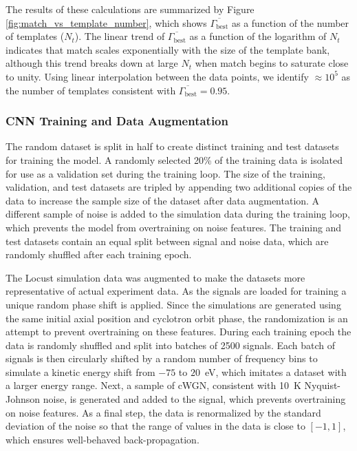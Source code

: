 The results of these calculations are summarized by Figure \ref{fig:match_vs_template_number}, which shows $\overline{\Gamma_\mathrm{best}}$ as a function of the number of templates ($N_t$). The linear trend of $\overline{\Gamma_\mathrm{best}}$ as a function of the logarithm of $N_t$ indicates that match scales exponentially with the size of the template bank, although this trend breaks down at large $N_t$ when match begins to saturate close to unity. Using linear interpolation between the data points, we identify $\approx10^5$ as the number of templates consistent with $\overline{\Gamma_\mathrm{best}}=0.95$.

\subsubsection{CNN Training and Data Augmentation}
The random dataset is split in half to create distinct training and test datasets for training the model. A randomly selected 20\% of the training data is isolated for use as a validation set during the training loop. The size of the training, validation, and test datasets are tripled by appending two additional copies of the data to increase the sample size of the dataset after data augmentation. A different sample of noise is added to the simulation data during the training loop, which prevents the model from overtraining on noise features. The training and test datasets contain an equal split between signal and noise data, which are randomly shuffled after each training epoch.

The Locust simulation data was augmented to make the datasets more representative of actual experiment data. As the signals are loaded for training a unique random phase shift is applied. Since the simulations are generated using the same initial axial position and cyclotron orbit phase, the randomization is an attempt to prevent overtraining on these features. During each training epoch the data is randomly shuffled and split into batches of 2500 signals. Each batch of signals is then circularly shifted by a random number of frequency bins to simulate a kinetic energy shift from $-75$ to $20$~eV, which imitates a dataset with a larger energy range. Next, a sample of cWGN, consistent with 10~K Nyquist-Johnson noise, is generated and added to the signal, which prevents overtraining on noise features. As a final step, the data is renormalized by the standard deviation of the noise so that the range of values in the data is close to $[-1,1]$, which ensures well-behaved back-propagation.

